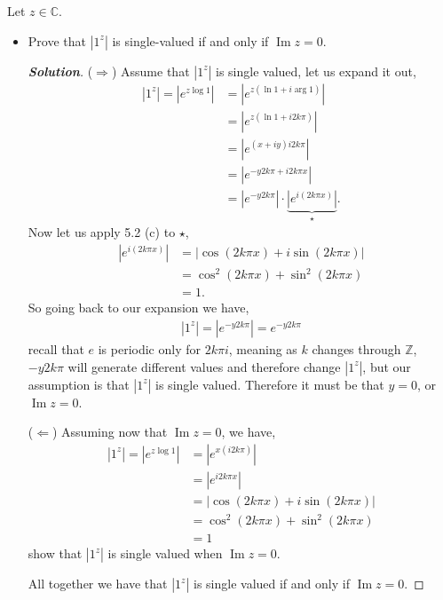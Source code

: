 \documentclass[11pt]{article}
\newenvironment{problem}[2][Problem\!]{\begin{trivlist}
\item[\hskip \labelsep {\bfseries #1}\hskip \labelsep {\bfseries #2}]}{\end{trivlist}}
\newenvironment{solution}{\begin{proof}[\textbf{\textit{Solution}}] }{\end{proof}}
\newcommand{\zz}{\mathbb Z}   %
\newcommand{\cc}{\mathbb C}   %
\newcommand{\abs}[1]{\left\lvert#1\right\rvert} %
\renewcommand{\Im}{\operatorname{Im}}
\begin{document}
\begin{problem}{5.6}
Let $z \in \cc$.
\begin{itemize}[itemsep=3em]
\item[(a)] Prove that $\abs{1^z}$ is single-valued if and only if $\Im z = 0$.
\begin{solution}
  ($\Rightarrow$) Assume that $\abs{1^{z}}$ is single valued, let us expand it out,
  \begin{align*}
    \abs{1^{z}} = \abs{e^{z\log 1}} &= \abs{e^{z(\ln 1 + i\arg 1)}} \\
    &= \abs{e^{z(\ln 1 + i2k\pi )}} \\
    &= \abs{e^{(x + i y) i2k\pi}} \\
    &= \abs{e^{-y2k\pi + i2k\pi x}} \\
    &= \abs{e^{-y2k\pi}}\cdot \underbrace{\abs{e^{i(2k\pi x)}}}_{\star}.
  \end{align*}
  Now let us apply 5.2 (c) to $\star$,
  \begin{align*}
    \abs{e^{i(2k\pi x)}} &= \abs{\cos(2k\pi x) + i \sin(2k\pi x)} \\
    &= \cos^{2}( 2k\pi x) + \sin^{2}( 2k\pi x) \\
    &= 1.
  \end{align*}
  So going back to our expansion we have,
  \begin{align*}
    \abs{1^{z}} = \abs{e^{- y2k\pi }} = e^{- y2k\pi }
  \end{align*}
  recall that $e$ is periodic only for $2k\pi i $, meaning as $k$ changes through $\zz$, $-y2k\pi$ will generate different values and therefore change $\abs{1^{z}}$, but our assumption is that $\abs{1^{z}}$ is single valued. Therefore it must be that $y = 0$, or $\Im z = 0$.

  ($\Leftarrow$) Assuming now that $\Im z = 0$, we have,
  \begin{align*}
    \abs{1^{z}} = \abs{e^{z \log 1}} &= \abs{e^{x(i2k\pi)}} \\
    &= \abs{e^{i2k\pi x}} \\
    &= \abs{\cos(2k\pi x) + i\sin(2k\pi x)} \\
    &= \cos^{2}(2k\pi x) + \sin^{2}(2k\pi x) \\
    &= 1
  \end{align*}
  show that $\abs{1^{z}}$ is single valued when $\Im z = 0$. 

  All together we have that $\abs{1^{z}}$ is single valued if and only if $\Im z = 0$.
\end{solution}


\end{itemize}
\end{problem}
\end{document}
